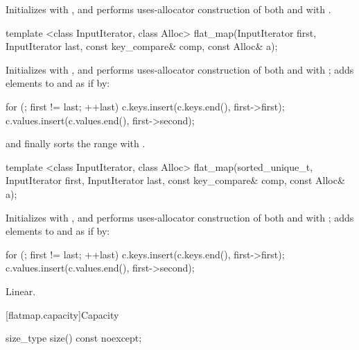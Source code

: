 \begin{codeblock}
\begin{codeblock}
\begin{codeblock}
\begin{addedblock}
\begin{itemdescr}
\pnum
\effects Initializes  with , and performs
uses-allocator construction of both
 and  with .
\end{itemdescr}

%
\begin{itemdecl}
template <class InputIterator, class Alloc>
  flat_map(InputIterator first, InputIterator last,
           const key_compare& comp, const Alloc& a);
\end{itemdecl}

\begin{itemdescr}
\pnum
\effects Initializes  with , and performs
uses-allocator construction of both
 and  with ; adds elements to
 and  as if by:
\begin{codeblock}
for (; first != last; ++last) {
  c.keys.insert(c.keys.end(), first->first);
  c.values.insert(c.values.end(), first->second);
}
\end{codeblock}
and finally sorts the range  with .
\end{itemdescr}

%
\begin{itemdecl}
template <class InputIterator, class Alloc>
  flat_map(sorted_unique_t, InputIterator first, InputIterator last,
           const key_compare& comp, const Alloc& a);
\end{itemdecl}

\begin{itemdescr}
\pnum
\effects Initializes  with , and performs
uses-allocator construction of both
 and  with ; adds elements to
 and  as if by:
\begin{codeblock}
for (; first != last; ++last) {
  c.keys.insert(c.keys.end(), first->first);
  c.values.insert(c.values.end(), first->second);
}
\end{codeblock}

\pnum
\complexity
Linear.
\end{itemdescr}

[flatmap.capacity]{Capacity}

%
\begin{itemdecl}
size_type size() const noexcept;
\end{itemdecl}


\end{addedblock}
\end{codeblock}
\end{codeblock}
\end{codeblock}
